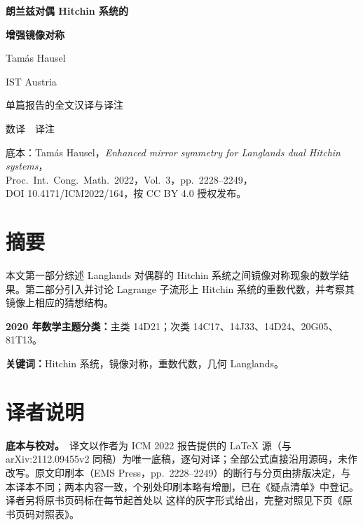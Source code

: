 
\begin{titlepage}
\centering
\vspace*{2.6cm}
{\Huge\bfseries\heiti 朗兰兹对偶 Hitchin 系统的\par}
\vspace{0.35cm}
{\Huge\bfseries\heiti 增强镜像对称\par}
\vspace{1.4cm}
{\Large Tamás Hausel\par}
\vspace{0.35cm}
{\large IST Austria\par}
\vspace{1.0cm}
{\large 单篇报告的全文汉译与译注\par}
\vspace{0.5cm}
{\large 数译\ \ 译注\par}
\vspace{1.8cm}
{\small
底本：Tamás Hausel，\emph{Enhanced mirror symmetry for Langlands dual Hitchin systems}，\\
Proc.\ Int.\ Cong.\ Math.\ 2022，Vol.~3，pp.~2228--2249，\\
DOI 10.4171/ICM2022/164，按 CC BY 4.0 授权发布。\par}
\vfill
\end{titlepage}

\section*{摘要}

本文第一部分综述 Langlands 对偶群的 Hitchin 系统之间镜像对称现象的数学结果。第二部分引入并讨论 Lagrange 子流形上 Hitchin 系统的重数代数，并考察其镜像上相应的猜想结构。

\medskip
\noindent\textbf{2020 年数学主题分类：}主类 14D21；次类 14C17、14J33、14D24、20G05、81T13。

\noindent\textbf{关键词：}Hitchin 系统，镜像对称，重数代数，几何 Langlands。

\section*{译者说明}

\textbf{底本与校对。}\ 译文以作者为 ICM 2022 报告提供的 \LaTeX{} 源（与 arXiv:2112.09455v2 同稿）为唯一底稿，逐句对译；全部公式直接沿用源码，未作改写。原文印刷本（EMS Press，pp.~2228--2249）的断行与分页由排版决定，与本译本不同；两本内容一致，个别处印刷本略有增删，已在《疑点清单》中登记。译者另将原书页码标在每节起首处以  这样的灰字形式给出，完整对照见下页《原书页码对照表》。

